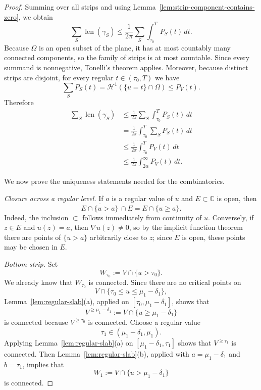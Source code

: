 \documentclass[12pt]{amsart}
\theoremstyle{definition}
\theoremstyle{remark}
\begin{document}
\begin{proof}
\indent Summing over all strips and using Lemma~\ref{lem:strip-component-contains-zero}, we obtain
\[
\sum_S \operatorname{len}(\gamma_S)\le \frac{1}{2\pi}\sum_S\int_{\tau_0}^{T} P_S(t)\,dt.
\]
Because $\Omega$ is an open subset of the plane, it has at most countably many connected components, so the family of strips is at most countable. Since every summand is nonnegative, Tonelli's theorem applies. Moreover, because distinct strips are disjoint, for every regular $t\in(\tau_0,T)$ we have
\[
\sum_S P_S(t)=\mathcal H^1(\{u=t\}\cap\Omega)\le P_V(t).
\]
Therefore
\begin{align}
\sum_S \operatorname{len}(\gamma_S)
&\le \frac{1}{2\pi}\sum_S\int_{\tau_0}^{T} P_S(t)\,dt \\
&= \frac{1}{2\pi}\int_{\tau_0}^{T}\sum_S P_S(t)\,dt \\
&\le \frac{1}{2\pi}\int_{\tau_0}^{T} P_V(t)\,dt \\
&\le \frac{1}{2\pi}\int_{2\alpha}^{\infty} P_V(t)\,dt.
\tag{11}
\end{align}

We now prove the uniqueness statements needed for the combinatorics.

\smallskip
\noindent\emph{Closure across a regular level.}
If $a$ is a regular value of $u$ and $E\subset\mathbb C$ is open, then
\[
\overline{E\cap\{u>a\}}\,\cap E = E\cap\{u\ge a\}.
\]
Indeed, the inclusion $\subset$ follows immediately from continuity of $u$. Conversely, if
$z\in E$ and $u(z)=a$, then $\nabla u(z)\neq 0$, so by the implicit function theorem there are points of
$\{u>a\}$ arbitrarily close to $z$; since $E$ is open, these points may be chosen in $E$.

\smallskip
\noindent\emph{Bottom strip.}
Set
\[
W_{\tau_0}:=V\cap\{u>\tau_0\}.
\]
We already know that $W_{\tau_0}$ is connected. Since there are no critical points on
\[
V\cap\{\tau_0\le u\le \mu_1-\delta_1\},
\]
Lemma~\ref{lem:regular-slab}(a), applied on $[\tau_0,\mu_1-\delta_1]$, shows that
\[
V^{\ge \mu_1-\delta_1}:=V\cap\{u\ge \mu_1-\delta_1\}
\]
is connected because $V^{\ge \tau_0}$ is connected. Choose a regular value
\[
\tau_1\in(\mu_1-\delta_1,\mu_1).
\]
Applying Lemma~\ref{lem:regular-slab}(a) on $[\mu_1-\delta_1,\tau_1]$ shows that
$V^{\ge \tau_1}$ is connected. Then Lemma~\ref{lem:regular-slab}(b), applied with
$a=\mu_1-\delta_1$ and $b=\tau_1$, implies that
\[
W_1:=V\cap\{u>\mu_1-\delta_1\}
\]
is connected.


\end{proof}
\end{document}
